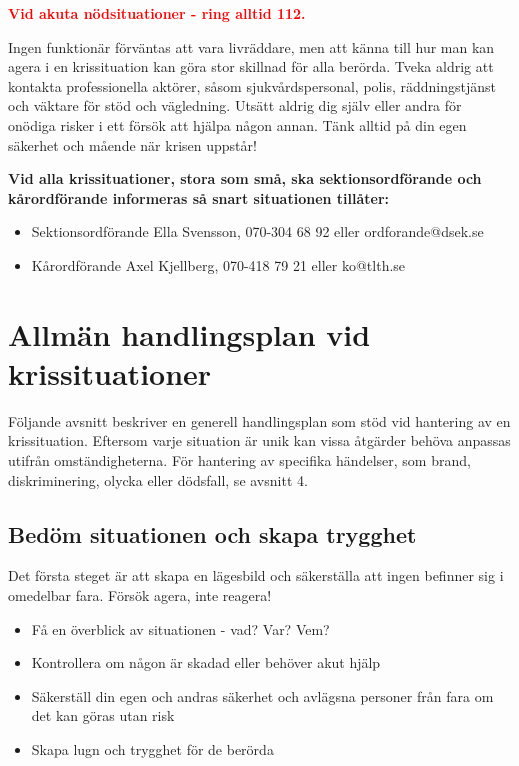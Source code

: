 \documentclass[pdfbookmarks,a4paper,11pt]{article}
\begin{document}
\textcolor{red}{\textbf{Vid akuta nödsituationer - ring alltid 112.}}

Ingen funktionär förväntas att vara livräddare, men att känna till hur man kan agera i en krissituation kan göra stor skillnad för alla berörda. Tveka aldrig att kontakta professionella aktörer, såsom sjukvårdspersonal, polis, räddningstjänst och väktare för stöd och vägledning. Utsätt aldrig dig själv eller andra för onödiga risker i ett försök att hjälpa någon annan. Tänk alltid på din egen säkerhet och mående när krisen uppstår!

\textbf{Vid alla krissituationer, stora som små, ska sektionsordförande och kårordförande informeras så snart situationen tillåter:}

\begin{itemize}
    \item Sektionsordförande Ella Svensson, 070-304 68 92 eller ordforande@dsek.se
    \item Kårordförande Axel Kjellberg, 070-418 79 21 eller ko@tlth.se
\end{itemize}

\section{Allmän handlingsplan vid krissituationer}

Följande avsnitt beskriver en generell handlingsplan som stöd vid hantering av en krissituation. Eftersom varje situation är unik kan vissa åtgärder behöva anpassas utifrån omständigheterna. För hantering av specifika händelser, som brand, diskriminering, olycka eller dödsfall, se avsnitt 4.

\subsection{Bedöm situationen och skapa trygghet}

Det första steget är att skapa en lägesbild och säkerställa att ingen befinner sig i omedelbar fara. Försök agera, inte reagera!

\begin{itemize}
    \item Få en överblick av situationen - vad? Var? Vem?
    \item Kontrollera om någon är skadad eller behöver akut hjälp
    \item Säkerställ din egen och andras säkerhet och avlägsna personer från fara om det kan göras utan risk
    \item Skapa lugn och trygghet för de berörda
\end{itemize}
\end{document}
